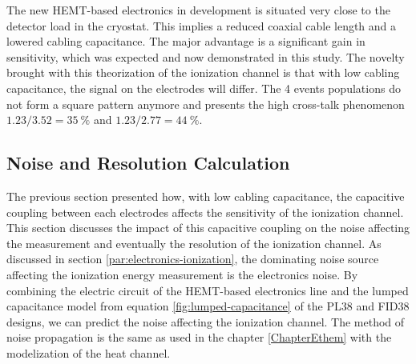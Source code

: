 The new HEMT-based electronics in development is situated very close to the detector load in the cryostat. This implies a reduced coaxial cable length and a lowered cabling capacitance. The major advantage is a significant gain in sensitivity, which was expected and now demonstrated in this study. The novelty brought with this theorization of the ionization channel is that with low cabling capacitance, the signal on the electrodes will differ. The 4 events populations do not form a square pattern anymore and presents the high cross-talk phenomenon $1.23/3.52=\SI{35}{\percent}$ and $1.23/2.77=\SI{44}{\percent}$.


\subsection{Noise and Resolution Calculation}
\label{par:ion-resolution-calculation}

The previous section presented how, with low cabling capacitance, the capacitive coupling between each electrodes affects the sensitivity of the ionization channel. This section discusses the impact of this capacitive coupling on the noise affecting the measurement and eventually the resolution of the ionization channel. As discussed in section \ref{par:electronics-ionization}, the dominating noise source affecting the ionization energy measurement is the electronics noise. By combining the electric circuit of the HEMT-based electronics line and the lumped capacitance model from equation \ref{fig:lumped-capacitance} of the PL38 and FID38 designs, we can predict the noise affecting the ionization channel. The method of noise propagation is the same as used in the chapter \ref{ChapterEthem} with the modelization of the heat channel.

%

